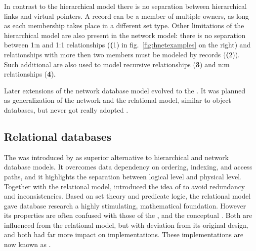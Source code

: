 In contrast to the hierarchical model there is no separation between
hierarchical links and virtual pointers. A record can be a member of multiple
owners, as long as each membership takes place in a different set type.
Other limitations of the hierarchical model are also present in the network
model: there is no separation between 1:n and 1:1 relationships
({\ormtext\small\textbf (1)} in fig.~\ref{fig:hnetexamples} on the right) and
relationships with more then two members must be modeled by records
({\ormtext\small\textbf (2)}). Such additional 
 are also used to model
recursive relationships ({\ormtext\small\textbf 3}) and
n:m relationships ({\ormtext\small\textbf 4}).

Later extensions of the network database model evolved to the . It was planned as generalization of the network and the relational
model, similar to object databases, but never got really adopted
\cite{Bachman1977,Steimann2007}.


\subsection{Relational databases}
\label{sec:rdbms}
The  was introduced by \textcite{Codd1970} as
superior alternative to hierarchical and network database models. It overcomes
data dependency on ordering, indexing, and access paths, and it highlights 
the separation between logical level and physical level. Together with the
relational model,  introduced the idea of 
 to avoid redundancy and inconsistencies.
Based on set theory and predicate logic, the relational
model gave database research a highly stimulating, mathematical foundation.
However its properties are often confused with those of the 
, and the 
conceptual . Both are influenced
from the relational model, but with deviation from its original design, and both 
had far more impact on implementations. These implementations are now known as 
. 

